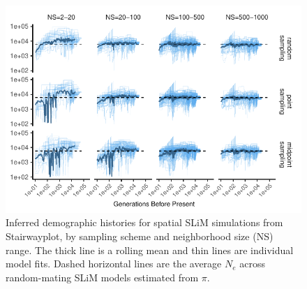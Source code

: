 \documentclass[10pt,twoside,lineno]{gsajnl}
\begin{document}
\afterpage{\clearpage}
\begin{figure}[p]
\centering
\includegraphics[width=\textwidth]{figures/stairwayplot_facet_rollmean.pdf}
\caption{Inferred demographic histories for spatial SLiM simulations from Stairwayplot, by sampling scheme and neighborhood size (NS) range. The thick line is a rolling mean and thin lines are individual model fits. Dashed horizontal lines are the average $N_{e}$ across random-mating SLiM models estimated from $\pi$.}
\label{fig:demography}
\end{figure}
\end{document}
